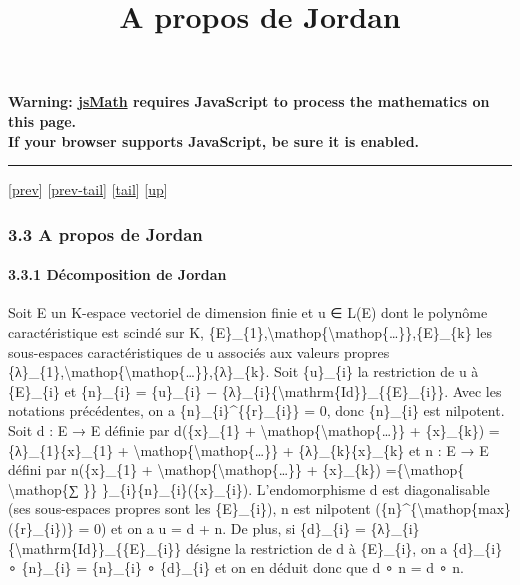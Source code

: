 \documentclass[]{article}
\title{A propos de Jordan}
\author{}
\date{}
\begin{document}
\maketitle

\textbf{Warning: \href{http://www.math.union.edu/locate/jsMath}{jsMath}
requires JavaScript to process the mathematics on this page.\\ If your
browser supports JavaScript, be sure it is enabled.}

\begin{center}\rule{3in}{0.4pt}\end{center}

{[}\href{coursse16.html}{prev}{]}
{[}\href{coursse16.html\#tailcoursse16.html}{prev-tail}{]}
{[}\hyperref[tailcoursse17.html]{tail}{]}
{[}\href{coursch4.html\#coursse17.html}{up}{]}

\subsubsection{3.3 A propos de Jordan}

\paragraph{3.3.1 Décomposition de Jordan}

Soit E un K-espace vectoriel de dimension finie et u ∈ L(E) dont le
polynôme caractéristique est scindé sur K,
\{E\}\_\{1\},\textbackslash{}mathop\{\textbackslash{}mathop\{\ldots{}\}\},\{E\}\_\{k\}
les sous-espaces caractéristiques de u associés aux valeurs propres
\{λ\}\_\{1\},\textbackslash{}mathop\{\textbackslash{}mathop\{\ldots{}\}\},\{λ\}\_\{k\}.
Soit \{u\}\_\{i\} la restriction de u à \{E\}\_\{i\} et \{n\}\_\{i\} =
\{u\}\_\{i\} −
\{λ\}\_\{i\}\{\textbackslash{}mathrm\{Id\}\}\_\{\{E\}\_\{i\}\}. Avec les
notations précédentes, on a \{n\}\_\{i\}\^{}\{\{r\}\_\{i\}\} = 0, donc
\{n\}\_\{i\} est nilpotent. Soit d : E → E définie par d(\{x\}\_\{1\} +
\textbackslash{}mathop\{\textbackslash{}mathop\{\ldots{}\}\} +
\{x\}\_\{k\}) = \{λ\}\_\{1\}\{x\}\_\{1\} +
\textbackslash{}mathop\{\textbackslash{}mathop\{\ldots{}\}\} +
\{λ\}\_\{k\}\{x\}\_\{k\} et n : E → E défini par n(\{x\}\_\{1\} +
\textbackslash{}mathop\{\textbackslash{}mathop\{\ldots{}\}\} +
\{x\}\_\{k\}) =\{\textbackslash{}mathop\{ \textbackslash{}mathop\{∑ \}\}
\}\_\{i\}\{n\}\_\{i\}(\{x\}\_\{i\}). L'endomorphisme d est
diagonalisable (ses sous-espaces propres sont les \{E\}\_\{i\}), n est
nilpotent (\{n\}\^{}\{\textbackslash{}mathop\{max\}(\{r\}\_\{i\})\} = 0)
et on a u = d + n. De plus, si \{d\}\_\{i\} =
\{λ\}\_\{i\}\{\textbackslash{}mathrm\{Id\}\}\_\{\{E\}\_\{i\}\} désigne
la restriction de d à \{E\}\_\{i\}, on a \{d\}\_\{i\} ∘ \{n\}\_\{i\} =
\{n\}\_\{i\} ∘ \{d\}\_\{i\} et on en déduit donc que d ∘ n = d ∘ n.
\end{document}
